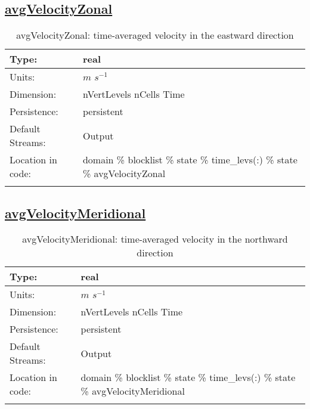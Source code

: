 \subsection[avgVelocityZonal]{\hyperref[sec:var_tab_state]{avgVelocityZonal}}
\label{subsec:var_sec_state_avgVelocityZonal}
\begin{center}
\begin{longtable}{| p{2.0in} | p{4.0in} |}
        \hline 
        Type: & real \\
        \hline 
        Units: & $m$ $s^{-1}$ \\
        \hline 
        Dimension: & nVertLevels nCells Time \\
        \hline 
        Persistence: & persistent \\
        \hline 
		 Default Streams: & Output  \\
        \hline 
		 Location in code: & domain \% blocklist \% state \% time\_levs(:) \% state \% avgVelocityZonal \\
		 \hline 
    \caption{avgVelocityZonal: time-averaged velocity in the eastward direction}
\end{longtable}
\end{center}
\subsection[avgVelocityMeridional]{\hyperref[sec:var_tab_state]{avgVelocityMeridional}}
\label{subsec:var_sec_state_avgVelocityMeridional}
\begin{center}
\begin{longtable}{| p{2.0in} | p{4.0in} |}
        \hline 
        Type: & real \\
        \hline 
        Units: & $m$ $s^{-1}$ \\
        \hline 
        Dimension: & nVertLevels nCells Time \\
        \hline 
        Persistence: & persistent \\
        \hline 
		 Default Streams: & Output  \\
        \hline 
		 Location in code: & domain \% blocklist \% state \% time\_levs(:) \% state \% avgVelocityMeridional \\
		 \hline 
    \caption{avgVelocityMeridional: time-averaged velocity in the northward direction}
\end{longtable}
\end{center}
